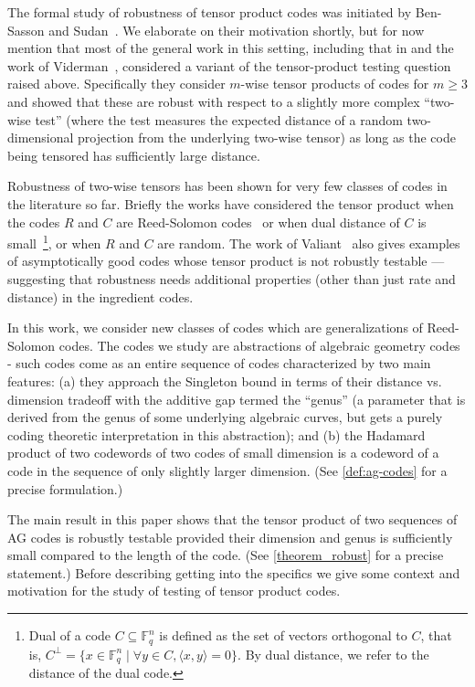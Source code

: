 \documentclass[11pt]{article}
\newcommand{\F}{\mathbb{F}}
\begin{document}
The formal study of robustness of tensor product codes was initiated by Ben-Sasson and Sudan~\cite{BSS-tensor}. We elaborate on their motivation shortly, but for now mention that most of the general work in this setting, including that in \cite{BSS-tensor} and the work of Viderman~\cite{Viderman:tensor}, considered a variant of the tensor-product testing question raised above. Specifically they consider $m$-wise tensor products of codes for $m \geq 3$ and showed that these are robust with respect to a slightly more complex ``two-wise test'' (where the test measures the expected distance of a random two-dimensional projection from the underlying two-wise tensor) as long as the code being tensored has sufficiently large distance. 

Robustness of two-wise tensors has been shown for very few classes of codes in the literature so far. Briefly the works have considered the tensor product when the codes $R$ and $C$ are Reed-Solomon codes~\cite{RubinfeldS,AroSaf,PolSpi} or when dual distance of $C$ is small~\cite{DSW}\footnote{Dual of a code $C\subseteq \F_q^n$ is defined as the set of vectors orthogonal to $C$, that is, $C^{\perp}=\{x\in\F_q^n\mid \forall y\in C, \langle x,y\rangle=0\}$. By dual distance, we refer to the distance of the dual code. }, or when $R$ and $C$ are random. The work of Valiant~\cite{valiant} also gives examples of asymptotically good codes whose tensor product is not robustly testable --- suggesting that robustness needs additional properties (other than just rate and distance) in the ingredient codes. 

In this work, we consider new classes of codes which are generalizations of Reed-Solomon codes. The codes we study are abstractions of algebraic geometry codes - such codes come as an entire sequence of codes characterized by two main features: (a) they approach the Singleton bound in terms of their distance vs. dimension tradeoff with the additive gap termed the ``genus'' (a parameter that is derived from the genus of some underlying algebraic curves, but gets a purely coding theoretic interpretation in this abstraction); and (b) the Hadamard product of two codewords of two codes of small dimension is a codeword of a code in the sequence of only slightly larger dimension. (See \cref{def:ag-codes} for a precise formulation.) 

The main result in this paper shows that the tensor product of two sequences of AG codes is robustly testable provided their dimension and genus is sufficiently small compared to the length of the code. (See \cref{theorem_robust} for a precise statement.) Before describing getting into the specifics we give some context and motivation for the study of testing of tensor product codes.
\end{document}
